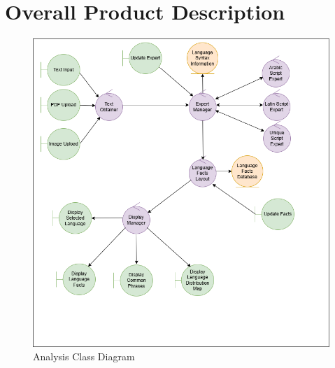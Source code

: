 \section{Overall Product Description}
\label{sec:overall_description}



\begin{figure}[H]
	\centering
	\includegraphics[width=\linewidth]{Section2/class_diagramV3.png}
	\caption{Analysis Class Diagram}
	\label{AnalysisClassDiagram}
\end{figure}


